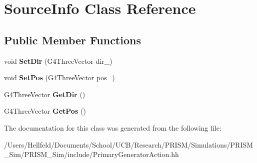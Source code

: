 \hypertarget{class_source_info}{}\section{Source\+Info Class Reference}
\label{class_source_info}
\subsection*{Public Member Functions}
\begin{DoxyCompactItemize}
\item 
\hypertarget{class_source_info_a4f4c79089d3b673c983b3386af781252}{}\label{class_source_info_a4f4c79089d3b673c983b3386af781252} 
void {\bfseries Set\+Dir} (G4\+Three\+Vector dir\+\_\+)
\item 
\hypertarget{class_source_info_a74b66677c80b7faf1fdbe24c30e5ba47}{}\label{class_source_info_a74b66677c80b7faf1fdbe24c30e5ba47} 
void {\bfseries Set\+Pos} (G4\+Three\+Vector pos\+\_\+)
\item 
\hypertarget{class_source_info_a4cba34710c2597da406874c2f27e5a36}{}\label{class_source_info_a4cba34710c2597da406874c2f27e5a36} 
G4\+Three\+Vector {\bfseries Get\+Dir} ()
\item 
\hypertarget{class_source_info_a1faaa44f3f69a0c251cf3339f8332092}{}\label{class_source_info_a1faaa44f3f69a0c251cf3339f8332092} 
G4\+Three\+Vector {\bfseries Get\+Pos} ()
\end{DoxyCompactItemize}


The documentation for this class was generated from the following file\+:\begin{DoxyCompactItemize}
\item 
/\+Users/\+Hellfeld/\+Documents/\+School/\+U\+C\+B/\+Research/\+P\+R\+I\+S\+M/\+Simulations/\+P\+R\+I\+S\+M\+\_\+\+Sim/\+P\+R\+I\+S\+M\+\_\+\+Sim/include/Primary\+Generator\+Action.\+hh\end{DoxyCompactItemize}
